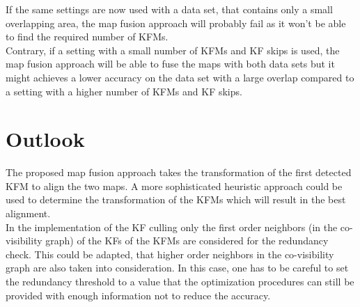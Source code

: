 If the same settings are now used with a data set, that contains only a small overlapping area, the map fusion approach will probably fail as it won't be able to find the required number of \acp{KFM}.\\

Contrary, if a setting with a small number of \acp{KFM} and \ac{KF} skips is used, the map fusion approach will be able to fuse the maps with both data sets but it might achieves a lower accuracy on the data set with a large overlap compared to a setting with a higher number of \acp{KFM} and \ac{KF} skips.

\section{Outlook}

The proposed map fusion approach takes the transformation of the first detected \ac{KFM} to align the two maps. A more sophisticated heuristic approach could be used to determine the transformation of the \acp{KFM} which will result in the best alignment.\\

In the implementation of the \ac{KF} culling only the first order neighbors (in the co-visibility graph) of the \acp{KF} of the \acp{KFM} are considered for the redundancy check. This could be adapted, that higher order neighbors in the co-visibility graph are also taken into consideration. In this case, one has to be careful to set the redundancy threshold to a value that the optimization procedures can still be provided with enough information not to reduce the accuracy.

